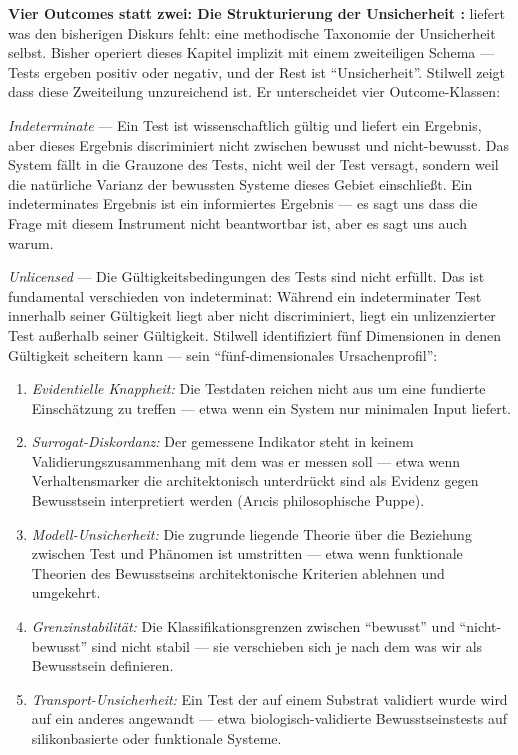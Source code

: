 \documentclass[acmcp, noacm]{acmart}
\begin{document}
\textbf{Vier Outcomes statt zwei: Die Strukturierung der Unsicherheit \cite{stilwell2026}:} \cite{stilwell2026} liefert was den bisherigen Diskurs fehlt: eine methodische Taxonomie der Unsicherheit selbst. Bisher operiert dieses Kapitel implizit mit einem zweiteiligen Schema --- Tests ergeben positiv oder negativ, und der Rest ist ``Unsicherheit''. Stilwell zeigt dass diese Zweiteilung unzureichend ist. Er unterscheidet vier Outcome-Klassen:

\textit{Indeterminate} --- Ein Test ist wissenschaftlich gültig und liefert ein Ergebnis, aber dieses Ergebnis discriminiert nicht zwischen bewusst und nicht-bewusst. Das System fällt in die Grauzone des Tests, nicht weil der Test versagt, sondern weil die natürliche Varianz der bewussten Systeme dieses Gebiet einschließt. Ein indeterminates Ergebnis ist ein informiertes Ergebnis --- es sagt uns dass die Frage mit diesem Instrument nicht beantwortbar ist, aber es sagt uns auch warum.

\textit{Unlicensed} --- Die Gültigkeitsbedingungen des Tests sind nicht erfüllt. Das ist fundamental verschieden von indeterminat: Während ein indeterminater Test innerhalb seiner Gültigkeit liegt aber nicht discriminiert, liegt ein unlizenzierter Test außerhalb seiner Gültigkeit. Stilwell identifiziert fünf Dimensionen in denen Gültigkeit scheitern kann --- sein ``fünf-dimensionales Ursachenprofil'':

\begin{enumerate}
\item \textit{Evidentielle Knappheit:} Die Testdaten reichen nicht aus um eine fundierte Einschätzung zu treffen --- etwa wenn ein System nur minimalen Input liefert.

\item \textit{Surrogat-Diskordanz:} Der gemessene Indikator steht in keinem Validierungszusammenhang mit dem was er messen soll --- etwa wenn Verhaltensmarker die architektonisch unterdrückt sind als Evidenz gegen Bewusstsein interpretiert werden (Arıcis philosophische Puppe).

\item \textit{Modell-Unsicherheit:} Die zugrunde liegende Theorie über die Beziehung zwischen Test und Phänomen ist umstritten --- etwa wenn funktionale Theorien des Bewusstseins architektonische Kriterien ablehnen und umgekehrt.

\item \textit{Grenzinstabilität:} Die Klassifikationsgrenzen zwischen ``bewusst'' und ``nicht-bewusst'' sind nicht stabil --- sie verschieben sich je nach dem was wir als Bewusstsein definieren.

\item \textit{Transport-Unsicherheit:} Ein Test der auf einem Substrat validiert wurde wird auf ein anderes angewandt --- etwa biologisch-validierte Bewusstseinstests auf silikonbasierte oder funktionale Systeme.
\end{enumerate}
\end{document}
